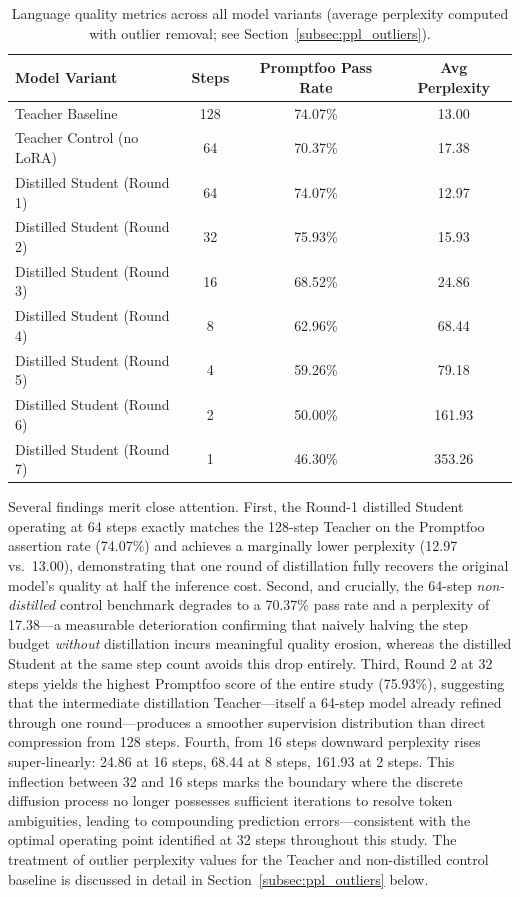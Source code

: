 \documentclass[11pt, a4paper]{article}
\begin{document}
\begin{table}[H]
\centering
\caption{Language quality metrics across all model variants (average perplexity computed with outlier removal; see Section~\ref{subsec:ppl_outliers}).}
\label{tab:quality_results}
\begin{tabular}{@{}lccc@{}}
\toprule
\textbf{Model Variant} & \textbf{Steps} & \textbf{Promptfoo Pass Rate} & \textbf{Avg Perplexity} \\ \midrule
Teacher Baseline            & 128 & 74.07\% & 13.00  \\
Teacher Control (no LoRA)   & 64  & 70.37\% & 17.38  \\
Distilled Student (Round 1) & 64  & 74.07\% & 12.97  \\
Distilled Student (Round 2) & 32  & 75.93\% & 15.93  \\
Distilled Student (Round 3) & 16  & 68.52\% & 24.86  \\
Distilled Student (Round 4) & 8   & 62.96\% & 68.44  \\
Distilled Student (Round 5) & 4   & 59.26\% & 79.18  \\
Distilled Student (Round 6) & 2   & 50.00\% & 161.93 \\
Distilled Student (Round 7) & 1   & 46.30\% & 353.26 \\ \bottomrule
\end{tabular}
\end{table}

Several findings merit close attention. First, the Round-1 distilled Student operating at 64 steps exactly matches the 128-step Teacher on the Promptfoo assertion rate (74.07\%) and achieves a marginally lower perplexity (12.97 vs.\ 13.00), demonstrating that one round of distillation fully recovers the original model's quality at half the inference cost. Second, and crucially, the 64-step \emph{non-distilled} control benchmark degrades to a 70.37\% pass rate and a perplexity of 17.38---a measurable deterioration confirming that naively halving the step budget \emph{without} distillation incurs meaningful quality erosion, whereas the distilled Student at the same step count avoids this drop entirely. Third, Round 2 at 32 steps yields the highest Promptfoo score of the entire study (75.93\%), suggesting that the intermediate distillation Teacher---itself a 64-step model already refined through one round---produces a smoother supervision distribution than direct compression from 128 steps. Fourth, from 16 steps downward perplexity rises super-linearly: 24.86 at 16 steps, 68.44 at 8 steps, 161.93 at 2 steps. This inflection between 32 and 16 steps marks the boundary where the discrete diffusion process no longer possesses sufficient iterations to resolve token ambiguities, leading to compounding prediction errors---consistent with the optimal operating point identified at 32 steps throughout this study. The treatment of outlier perplexity values for the Teacher and non-distilled control baseline is discussed in detail in Section~\ref{subsec:ppl_outliers} below.
\end{document}
